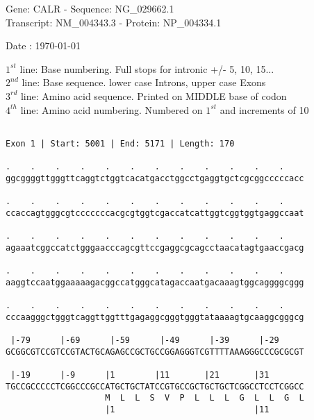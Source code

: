 \documentclass{article}
\begin{document}
\begin{center}
\begin{large}
Gene: CALR - Sequence: NG\_029662.1\\
Transcript: NM\_004343.3 - Protein: NP\_004334.1
 
 Date : \today
\end{large}
\end{center}
$1^{st}$ line: Base numbering. Full stops for intronic +/- 5, 10, 15...\\
$2^{nd}$ line: Base sequence. lower case Introns, upper case Exons\\
$3^{rd}$ line: Amino acid sequence. Printed on MIDDLE base of codon\\
$4^{th}$ line: Amino acid numbering. Numbered on $1^{st}$ and increments of 10\\
 \begin{Verbatim}
 
Exon 1 | Start: 5001 | End: 5171 | Length: 170
 
.    .    .    .    .    .    .    .    .    .    .    .    
ggcggggttgggttcaggtctggtcacatgacctggcctgaggtgctcgcggcccccacc
                                                            
.    .    .    .    .    .    .    .    .    .    .    .    
ccaccagtgggcgtcccccccacgcgtggtcgaccatcattggtcggtggtgaggccaat
                                                            
.    .    .    .    .    .    .    .    .    .    .    .    
agaaatcggccatctgggaacccagcgttccgaggcgcagcctaacatagtgaaccgacg
                                                            
.    .    .    .    .    .    .    .    .    .    .    .    
aaggtccaatggaaaaagacggccatgggcatagaccaatgacaaagtggcaggggcggg
                                                            
.    .    .    .    .    .    .    .    .    .    .    .    
cccaagggctgggtcaggttggtttgagaggcgggtgggtataaaagtgcaaggcgggcg
                                                            
 |-79      |-69      |-59      |-49      |-39      |-29     
GCGGCGTCCGTCCGTACTGCAGAGCCGCTGCCGGAGGGTCGTTTTAAAGGGCCCGCGCGT
                                                            
 |-19      |-9      |1        |11       |21       |31       
TGCCGCCCCCTCGGCCCGCCATGCTGCTATCCGTGCCGCTGCTGCTCGGCCTCCTCGGCC
                    M  L  L  S  V  P  L  L  L  G  L  L  G  L
                    |1                            |11       
  

\end{Verbatim}
\end{document}
